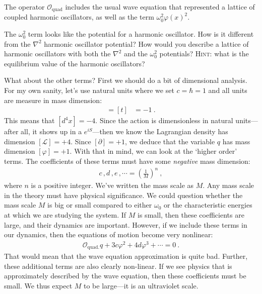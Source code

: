 The operator $\mathcal{O}_\text{quad}$ includes the usual wave equation that represented a lattice of coupled harmonic oscillators, as well as the term $\omega_0^2 \varphi(x)^2$.  
\begin{exercise}
The $\omega_0^2$ term looks like the potential for a harmonic oscillator. How is it different from the $\nabla^2$ harmonic oscillator potential? How would you describe a lattice of harmonic oscillators with both the $\nabla^2$ and the $\omega_0^2$ potentials? \textsc{Hint}: what is the equilibrium value of the harmonic oscillators?
\end{exercise}

What about the other terms? First we should do a bit of dimensional analysis. For my own sanity, let's use natural units where we set $c=\hbar =1$ and all units are measure in mass dimension:
\begin{align}
	[x] = [t] &= -1 \ .
\end{align}
This means that $[d^4x] = -4$. Since the action is dimensionless in natural units---after all, it shows up in a $e^{iS}$---then we know the Lagrangian density has dimension $[\mathcal L] = +4$. Since $[\partial]=+1$, we deduce that the variable $q$ has mass dimension $[\varphi]=+1$. With that in mind, we can look at the `higher order' terms. The coefficients of these terms must have some \emph{negative} mass dimension:
\begin{align}
	c\, , d\, , e \, , \cdots = \left(\frac{1}{M}\right)^n \ ,
\end{align}
where $n$ is a positive integer. We've written the mass scale as $M$. Any mass scale in the theory must have physical significance. We could question whether the mass scale $M$ is big or small compared to either $\omega_0$ or the characteristic energies at which we are studying the system. If $M$ is small, then these coefficients are large, and their dynamics are important. However, if we include these terms in our dynamics, then the equations of motion become very nonlinear:
\begin{align}
	\mathcal O_\text{quad.} q + 3c\varphi^2 + 4d \varphi^3 + \cdots = 0 \ .
\end{align}
That would mean that the wave equation approximation is quite bad. Further, these additional terms are also clearly non-linear.  If we see physics that is approximately described by the wave equation, then these coefficients must be small. We thus expect $M$ to be large---it is an ultraviolet scale. 

